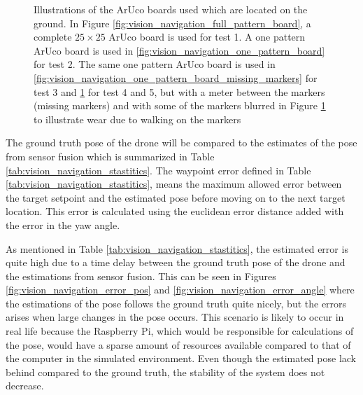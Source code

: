 \documentclass[../Head/report.tex]{subfiles}
\begin{document}
\begin{figure}[H]
\begin{subfigure}[t]{.20\textwidth}
        \caption{}
        \label{fig:vision_navigation_one_pattern_board_missing_markers_wear}
    \end{subfigure}
    \caption{Illustrations of the ArUco boards used which are located on the ground. In Figure \ref{fig:vision_navigation_full_pattern_board}, a complete $25 \times 25$ ArUco board is used for test 1. A one pattern ArUco board is used in \ref{fig:vision_navigation_one_pattern_board} for test 2. The same one pattern ArUco board is used in \ref{fig:vision_navigation_one_pattern_board_missing_markers} for test 3 and \ref{fig:vision_navigation_one_pattern_board_missing_markers_wear} for test 4 and 5, but with a meter between the markers (missing markers) and with some of the markers blurred in Figure \ref{fig:vision_navigation_one_pattern_board_missing_markers_wear} to illustrate wear due to walking on the markers}  
    \label{fig:vision_navigation_boards}
\end{figure}

The ground truth pose of the drone will be compared to the estimates of the pose from sensor fusion which is summarized in Table \ref{tab:vision_navigation_stastitics}. The waypoint error defined in Table \ref{tab:vision_navigation_stastitics}, means the maximum allowed error between the target setpoint and the estimated pose before moving on to the next target location. This error is calculated using the euclidean error distance added with the error in the yaw angle. 

As mentioned in Table \ref{tab:vision_navigation_stastitics}, the estimated error is quite high due to a time delay between the ground truth pose of the drone and the estimations from sensor fusion. This can be seen in Figures \ref{fig:vision_navigation_error_pos} and \ref{fig:vision_navigation_error_angle} where the estimations of the pose follows the ground truth quite nicely, but the errors arises when large changes in the pose occurs. This scenario is likely to occur in real life because the Raspberry Pi, which would be responsible for calculations of the pose, would have a sparse amount of resources available compared to that of the computer in the simulated environment. Even though the estimated pose lack behind compared to the ground truth, the stability of the system does not decrease.    
\end{document}
